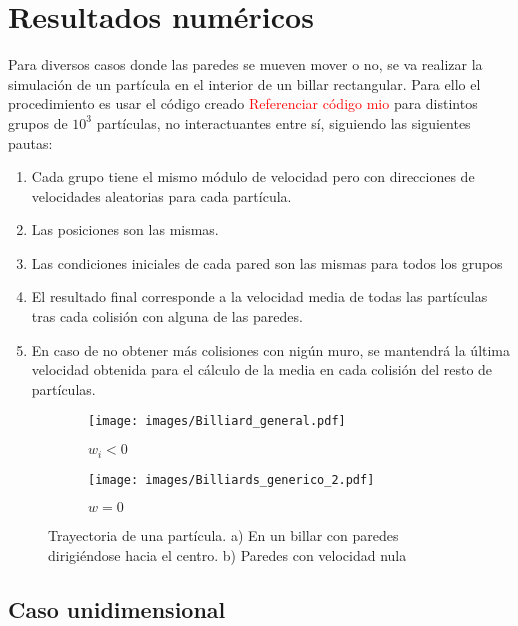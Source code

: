 \documentclass[11pt, spanish]{book}
\begin{document}
\chapter{Resultados numéricos}

Para diversos casos donde las paredes se mueven mover o no, se va realizar la simulación de un partícula en el interior de un billar rectangular. Para ello el procedimiento es usar el código creado \textcolor{red}{Referenciar código mio} para distintos grupos de \( 10^3 \) partículas, no interactuantes entre sí, siguiendo las siguientes pautas:

\begin{enumerate}
    \item Cada grupo tiene el mismo módulo de velocidad pero con direcciones de velocidades aleatorias para cada partícula.
    \item Las posiciones son las mismas.
    \item Las condiciones iniciales de cada pared son las mismas para todos los grupos
    \item El resultado final corresponde a la velocidad media de todas las partículas tras cada colisión con alguna de las paredes.
    \item En caso de no obtener más colisiones con nigún muro, se mantendrá la última velocidad obtenida para el cálculo de la media en cada colisión del resto de partículas.
\end{enumerate}

\begin{figure}[H]
    \begin{subfigure}[b]{0.5\textwidth}
        \centering
        \texttt{[image: images/Billiard\_general.pdf]}
        \caption{$w_i<0$}
        \label{fig:a}
    \end{subfigure}
    \hfill
    \begin{subfigure}[b]{0.5\textwidth}
        \centering
        \texttt{[image: images/Billiards\_generico\_2.pdf]}
        \caption{$w=0$}
        \label{fig:s}
    \end{subfigure}
    \caption{Trayectoria de una partícula. a) En un billar con paredes dirigiéndose hacia el centro. b) Paredes con velocidad nula}
\end{figure}

\section{Caso unidimensional}
\end{document}
